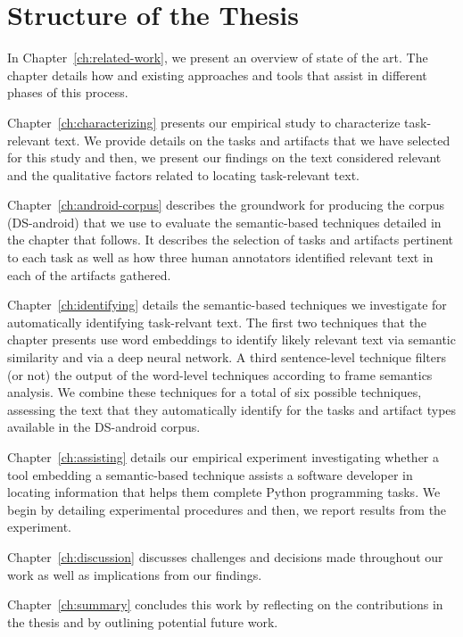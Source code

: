 \section{Structure of the Thesis}
\label{cp1:organization}

In Chapter~\ref{ch:related-work}, we present an overview of state of the art. The chapter details 
how  and existing approaches and tools 
that assist in different phases of this process.


Chapter~\ref{ch:characterizing} presents our empirical study to characterize task-relevant text.
We provide details on the tasks and artifacts that we have selected for this study
and then, we present our findings on the text considered relevant 
and the qualitative factors related to locating task-relevant text.


Chapter~\ref{ch:android-corpus} describes the groundwork 
for producing the corpus (\acs{DS-android}) that we use to evaluate the semantic-based techniques 
detailed in the chapter that follows. It describes the selection of tasks 
and 
artifacts pertinent to each task 
as well as how three human annotators identified relevant text in each of the artifacts gathered.


Chapter~\ref{ch:identifying} details the semantic-based techniques we investigate for automatically 
identifying task-relvant text.
The first two techniques that the chapter presents 
use word embeddings to identify likely relevant text via semantic similarity
and via a deep neural network.
A third sentence-level technique filters (or not) 
the output of the word-level techniques according to frame semantics analysis.
We combine these techniques for a total of six possible techniques, 
assessing 
the text that they automatically identify for the tasks and artifact types
available in the \acs{DS-android} corpus.




Chapter~\ref{ch:assisting} details our empirical experiment investigating 
whether a tool embedding a semantic-based technique assists a software developer in locating information
that helps them complete Python programming tasks. We begin by detailing experimental procedures
and then, we report results from the experiment.


Chapter~\ref{ch:discussion}  discusses challenges and decisions 
made throughout our work 
as well as implications from our findings. 


Chapter~\ref{ch:summary} concludes this work by reflecting on the contributions in the thesis
and by outlining  potential future work. 
